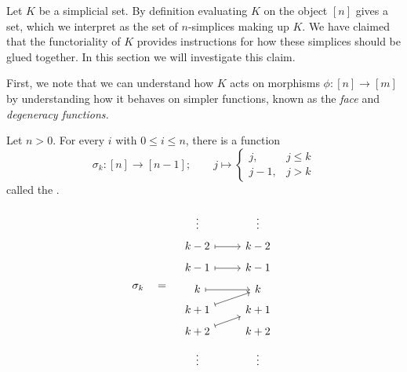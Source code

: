 \documentclass[main.tex]{subfiles}
\begin{document}
Let $K$ be a simplicial set. By definition evaluating $K$ on the object $[n]$ gives a set, which we interpret as the set of $n$-simplices making up $K$. We have claimed that the functoriality of $K$ provides instructions for how these simplices should be glued together. In this section we will investigate this claim.

First, we note that we can understand how $K$ acts on morphisms $\phi\colon [n] \to [m]$ by understanding how it behaves on simpler functions, known as the \emph{face} and \emph{degeneracy functions.}

\begin{definition}
  \label{def:degeneracy_function_simplicial_category}
  Let $n > 0$. For every $i$ with $0 \leq i \leq n$, there is a function
  \begin{equation*}
    \sigma_{k}\colon [n] \to [n - 1];\qquad j \mapsto
    \begin{cases}
      j, & j \leq k \\
      j - 1, & j > k
    \end{cases}
  \end{equation*}
  called the .
\end{definition}
\begin{equation*}
  \sigma_{k} \quad = \quad
  \begin{tikzcd}[row sep=tiny]
    \vdots & \vdots
    \\
    k-2
    \arrow[r, mapsto]
    & k-2
    \\
    k-1 
    \arrow[r, mapsto]
    & k-1
    \\
    k 
    \arrow[r, mapsto]
    & k
    \\
    k+1 
    \arrow[ur, mapsto]
    & k+1
    \\
    k+2
    \arrow[ur, mapsto]
    & k+2
    \\
    \vdots & \vdots
  \end{tikzcd}
\end{equation*}
\end{document}
